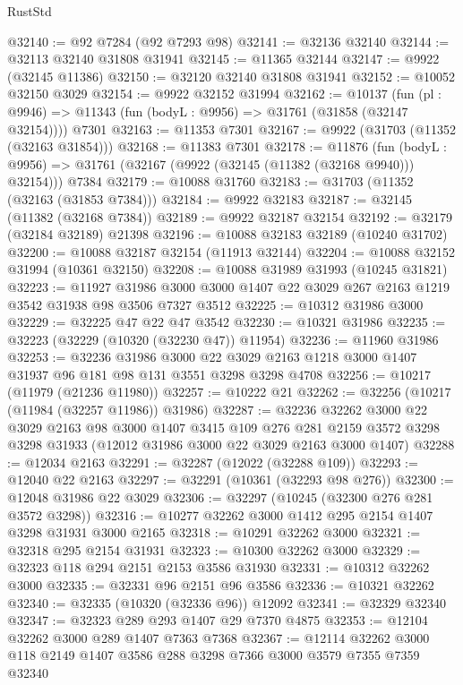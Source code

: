 \begin{lexlean}{RustStd}
\begin{coremodule}
@32140 := @92 @7284 (@92 @7293 @98)
@32141 := @32136 @32140
@32144 := @32113 @32140 @31808 @31941
@32145 := @11365 @32144
@32147 := @9922 (@32145 @11386)
@32150 := @32120 @32140 @31808 @31941
@32152 := @10052 @32150 @3029
@32154 := @9922 @32152 @31994
@32162 := @10137
    (fun (pl : @9946) => @11343 (fun (bodyL : @9956) => @31761 (@31858 (@32147 @32154))))
    @7301
@32163 := @11353 @7301
@32167 := @9922 (@31703 (@11352 (@32163 @31854)))
@32168 := @11383 @7301
@32178 := @11876
    (fun (bodyL : @9956) => @31761 (@32167 (@9922 (@32145 (@11382 (@32168 @9940))) @32154)))
    @7384
@32179 := @10088 @31760
@32183 := @31703 (@11352 (@32163 (@31853 @7384)))
@32184 := @9922 @32183
@32187 := @32145 (@11382 (@32168 @7384))
@32189 := @9922 @32187 @32154
@32192 := @32179 (@32184 @32189) @21398
@32196 := @10088 @32183 @32189 (@10240 @31702)
@32200 := @10088 @32187 @32154 (@11913 @32144)
@32204 := @10088 @32152 @31994 (@10361 @32150)
@32208 := @10088 @31989 @31993 (@10245 @31821)
@32223 := @11927
    @31986
    @3000
    @3000
    @1407
    @22
    @3029
    @267
    @2163
    @1219
    @3542
    @31938
    @98
    @3506
    @7327
    @3512
@32225 := @10312 @31986 @3000
@32229 := @32225 @47 @22 @47 @3542
@32230 := @10321 @31986
@32235 := @32223 (@32229 (@10320 (@32230 @47)) @11954)
@32236 := @11960 @31986
@32253 := @32236
    @31986
    @3000
    @22
    @3029
    @2163
    @1218
    @3000
    @1407
    @31937
    @96
    @181
    @98
    @131
    @3551
    @3298
    @3298
    @4708
@32256 := @10217 (@11979 (@21236 @11980))
@32257 := @10222 @21
@32262 := @32256 (@10217 (@11984 (@32257 @11986)) @31986)
@32287 := @32236
    @32262
    @3000
    @22
    @3029
    @2163
    @98
    @3000
    @1407
    @3415
    @109
    @276
    @281
    @2159
    @3572
    @3298
    @3298
    @31933
    (@12012 @31986 @3000 @22 @3029 @2163 @3000 @1407)
@32288 := @12034 @2163
@32291 := @32287 (@12022 (@32288 @109))
@32293 := @12040 @22 @2163
@32297 := @32291 (@10361 (@32293 @98 @276))
@32300 := @12048 @31986 @22 @3029
@32306 := @32297 (@10245 (@32300 @276 @281 @3572 @3298))
@32316 := @10277 @32262 @3000 @1412 @295 @2154 @1407 @3298 @31931 @3000 @2165
@32318 := @10291 @32262 @3000
@32321 := @32318 @295 @2154 @31931
@32323 := @10300 @32262 @3000
@32329 := @32323 @118 @294 @2151 @2153 @3586 @31930
@32331 := @10312 @32262 @3000
@32335 := @32331 @96 @2151 @96 @3586
@32336 := @10321 @32262
@32340 := @32335 (@10320 (@32336 @96)) @12092
@32341 := @32329 @32340
@32347 := @32323 @289 @293 @1407 @29 @7370 @4875
@32353 := @12104 @32262 @3000 @289 @1407 @7363 @7368
@32367 := @12114 @32262 @3000 @118 @2149 @1407 @3586 @288 @3298 @7366 @3000 @3579 @7355 @7359 @32340

\end{coremodule}
\end{lexlean}

